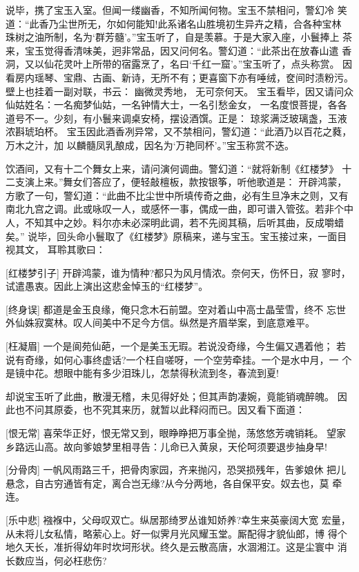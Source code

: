 说毕，携了宝玉入室。但闻一缕幽香，不知所闻何物。宝玉不禁相问，警幻冷
笑道：“此香乃尘世所无，尔如何能知!此系诸名山胜境初生异卉之精，合各种宝林
珠树之油所制，名为‘群芳髓’。”宝玉听了，自是羡慕。于是大家入座，小鬟捧上
茶来，宝玉觉得香清味美，迥非常品，因又问何名。警幻道：“此茶出在放春山遣
香洞，又以仙花灵叶上所带的宿露烹了，名曰‘千红一窟’。”宝玉听了，点头称赏。
因看房内瑶琴、宝鼎、古画、新诗，无所不有；更喜窗下亦有唾绒，奁间时渍粉污。
壁上也挂着一副对联，书云：
幽微灵秀地，
无可奈何天。
宝玉看毕，因又请问众仙姑姓名：一名痴梦仙姑，一名钟情大士，一名引愁金女，
一名度恨菩提，各各道号不一。少刻，有小鬟来调桌安椅，摆设酒馔。正是：
琼浆满泛玻璃盏，玉液浓斟琥珀杯。
宝玉因此酒香冽异常，又不禁相问，警幻道：“此酒乃以百花之蕤，万木之汁，加
以麟髓凤乳酿成，因名为‘万艳同杯’。”宝玉称赏不迭。

饮酒间，又有十二个舞女上来，请问演何调曲。警幻道：“就将新制《红楼梦》
十二支演上来。”舞女们答应了，便轻敲檀板，款按银筝，听他歌道是：
开辟鸿蒙，
方歌了一句，警幻道：“此曲不比尘世中所填传奇之曲，必有生旦净末之则，又有
南北九宫之调。此或咏叹一人，或感怀一事，偶成一曲，即可谱入管弦。若非个中
人，不知其中之妙。料尔亦未必深明此调，若不先阅其稿，后听其曲，反成嚼蜡矣。”
说毕，回头命小鬟取了《红楼梦》原稿来，递与宝玉。宝玉接过来，一面目视其文，
耳聆其歌曰：

[红楼梦引子]
开辟鸿蒙，谁为情种?都只为风月情浓。奈何天，伤怀日，寂
寥时，试遣愚衷。因此上演出这悲金悼玉的“红楼梦”。

[终身误]
都道是金玉良缘，俺只念木石前盟。空对着山中高士晶莹雪，终不
忘世外仙姝寂寞林。叹人间美中不足今方信。纵然是齐眉举案，到底意难平。

[枉凝眉]
一个是阆苑仙葩，一个是美玉无瑕。若说没奇缘，今生偏又遇着他；
若说有奇缘，如何心事终虚话?一个枉自嗟呀，一个空劳牵挂。一个是水中月，一
个是镜中花。想眼中能有多少泪珠儿，怎禁得秋流到冬，春流到夏!

却说宝玉听了此曲，散漫无稽，未见得好处；但其声韵凄婉，竟能销魂醉魄。
因此也不问其原委，也不究其来历，就暂以此释闷而已。因又看下面道：

[恨无常]
喜荣华正好，恨无常又到，眼睁睁把万事全抛，荡悠悠芳魂销耗。
望家乡路远山高。故向爹娘梦里相寻告：儿命已入黄泉，天伦呵须要退步抽身早!

[分骨肉]
一帆风雨路三千，把骨肉家园，齐来抛闪，恐哭损残年，告爹娘休
把儿悬念，自古穷通皆有定，离合岂无缘?从今分两地，各自保平安。奴去也，莫
牵连。

[乐中悲]
襁褓中，父母叹双亡。纵居那绮罗丛谁知娇养?幸生来英豪阔大宽
宏量，从未将儿女私情，略萦心上。好一似霁月光风耀玉堂。厮配得才貌仙郎，博
得个地久天长，准折得幼年时坎坷形状。终久是云散高唐，水涸湘江。这是尘寰中
消长数应当，何必枉悲伤?

